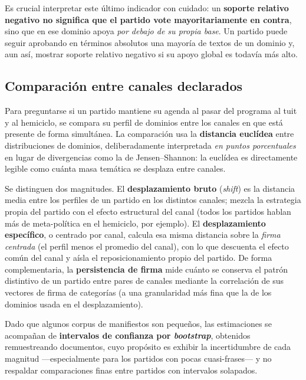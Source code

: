 Es crucial interpretar este último indicador con cuidado: un \textbf{soporte
relativo negativo no significa que el partido vote mayoritariamente en contra},
sino que en ese dominio apoya \emph{por debajo de su propia base}. Un partido
puede seguir aprobando en términos absolutos una mayoría de textos de un dominio
y, aun así, mostrar soporte relativo negativo si su apoyo global es todavía más
alto.

\subsection{Comparación entre canales declarados}
\label{sec:metricas-cross-channel}

Para preguntarse si un partido mantiene su agenda al pasar del programa al tuit y
al hemiciclo, se compara su perfil de dominios entre los canales en que está
presente de forma simultánea. La comparación usa la \textbf{distancia euclídea}
entre distribuciones de dominios, deliberadamente interpretada \emph{en puntos
porcentuales} en lugar de divergencias como la de Jensen--Shannon: la euclídea es
directamente legible como cuánta masa temática se desplaza entre canales.

Se distinguen dos magnitudes. El \textbf{desplazamiento bruto} (\emph{shift}) es
la distancia media entre los perfiles de un partido en los distintos canales;
mezcla la estrategia propia del partido con el efecto estructural del canal
(todos los partidos hablan más de meta-política en el hemiciclo, por ejemplo). El
\textbf{desplazamiento específico}, o centrado por canal, calcula esa misma
distancia sobre la \emph{firma centrada}
(el perfil menos el promedio del canal), con lo que descuenta el efecto común del
canal y aísla el reposicionamiento propio del partido. De forma complementaria,
la \textbf{persistencia de firma} mide cuánto se conserva el patrón distintivo de
un partido entre pares de canales mediante la correlación de sus vectores de
firma de categorías (a una granularidad más fina que la de los dominios usada en
el desplazamiento).

Dado que algunos corpus de manifiestos son pequeños, las estimaciones se
acompañan de \textbf{intervalos de confianza por \emph{bootstrap}}, obtenidos
remuestreando documentos, cuyo propósito es exhibir la incertidumbre de cada
magnitud ---especialmente para los partidos con pocas cuasi-frases--- y no
respaldar comparaciones finas entre partidos con intervalos solapados.

